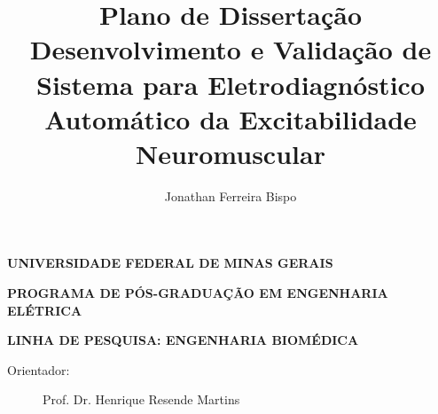 \documentclass[a4paper,10pt]{article}
\title{Plano de Dissertação \\ Desenvolvimento e Validação de Sistema para Eletrodiagnóstico Automático da Excitabilidade Neuromuscular}
\author{Jonathan Ferreira Bispo}
\date{}
\begin{document}
\maketitle

\begin{center}
  \textbf{UNIVERSIDADE FEDERAL DE MINAS GERAIS}

  \textbf{PROGRAMA DE PÓS-GRADUAÇÃO EM ENGENHARIA ELÉTRICA}

  \textbf{LINHA DE PESQUISA: ENGENHARIA BIOMÉDICA}
\end{center}

\begin{description}
  \item [Orientador:] Prof. Dr. Henrique Resende Martins
\end{description}

\newpage

\tableofcontents

\newpage












\end{document}
